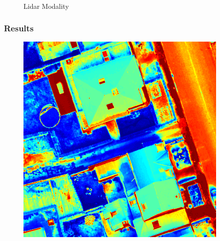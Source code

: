 \documentclass{beamer}
\begin{document}
\begin{frame}
\begin{figure}[ht]
\begin{minipage}[b]{0.45\linewidth}
      \caption{Lidar Modality}
    \end{minipage}
  \end{figure}
\end{frame}


\begin{frame}
  \frametitle{Results}
  \begin{figure}[ht]
    \begin{minipage}[b]{0.3\linewidth}
      \centering
      \includegraphics[width=\textwidth]{./Images/DFC2015/evec1.png}
    \end{minipage}
    \begin{minipage}[b]{0.3\linewidth}
      \centering

\end{minipage}
\end{figure}
\end{frame}
\end{document}
